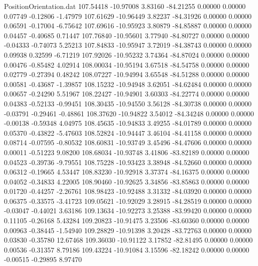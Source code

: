 \begin{filecontents}{PositionOrientation.dat}
 107.54418  -10.97008    3.83160   -84.21255    0.00000    0.00000    0.07749   -0.12806   -1.47979
 107.61629  -10.96449    3.82237   -84.31926    0.00000    0.00000    0.06591   -0.17004   -6.75642
 107.69616  -10.95923    3.80879   -84.85887    0.00000    0.00000    0.04457   -0.40685    0.71447
 107.76840  -10.95601    3.77940   -84.80727    0.00000    0.00000   -0.04333   -0.74073    5.25213
 107.84833  -10.95947    3.72019   -84.38743    0.00000    0.00000    0.09938    0.32599   -6.71219
 107.92026  -10.95232    3.74364   -84.87024    0.00000    0.00000    0.00476   -0.85482    4.02914
 108.00034  -10.95194    3.67518   -84.54758    0.00000    0.00000    0.02779   -0.27394    0.48242
 108.07227  -10.94994    3.65548   -84.51288    0.00000    0.00000    0.00581   -0.43687   -1.39857
 108.15232  -10.94948    3.62051   -84.62484    0.00000    0.00000    0.00657   -0.24290    5.51967
 108.22427  -10.94901    3.60303   -84.22774    0.00000    0.00000    0.04383   -0.52133   -0.99451
 108.30435  -10.94550    3.56128   -84.30738    0.00000    0.00000   -0.03791   -0.29461   -0.48861
 108.37620  -10.94822    3.54012   -84.34248    0.00000    0.00000   -0.00138   -0.59348    4.04975
 108.45635  -10.94833    3.49255   -84.01789    0.00000    0.00000    0.05370   -0.43822   -5.47603
 108.52824  -10.94447    3.46104   -84.41158    0.00000    0.00000    0.08714   -0.07595   -0.80532
 108.60831  -10.93749    3.45496   -84.47606    0.00000    0.00000    0.00011   -0.51223    9.08200
 108.68034  -10.93748    3.41806   -83.82189    0.00000    0.00000    0.04523   -0.39736   -9.79551
 108.75228  -10.93423    3.38948   -84.52660    0.00000    0.00000    0.06312   -0.19665    4.53447
 108.83230  -10.92918    3.37374   -84.16375    0.00000    0.00000    0.04052   -0.34833    4.22005
 108.90460  -10.92625    3.34856   -83.85863    0.00000    0.00000    0.01720   -0.44257   -2.26761
 108.98423  -10.92488    3.31332   -84.03920    0.00000    0.00000    0.06375   -0.33575   -3.41723
 109.05621  -10.92029    3.28915   -84.28519    0.00000    0.00000   -0.03047   -0.44021    3.63186
 109.13634  -10.92273    3.25388   -83.99420    0.00000    0.00000    0.11105   -0.26168    5.43284
 109.20823  -10.91475    3.23506   -83.60360    0.00000    0.00000    0.00963   -0.38445   -1.54940
 109.28829  -10.91398    3.20428   -83.72763    0.00000    0.00000    0.03830   -0.35780   12.67468
 109.36030  -10.91122    3.17852   -82.81495    0.00000    0.00000    0.00536   -0.31357    8.79186
 109.43224  -10.91084    3.15596   -82.18242    0.00000    0.00000   -0.00515   -0.29895    8.97470

\end{filecontents}
